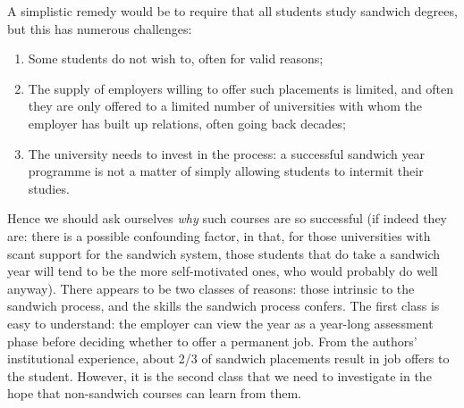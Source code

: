 \documentclass[conference]{IEEEtran}
\begin{document}
A simplistic remedy would be to require that all students study
sandwich degrees, but this has numerous challenges:

\begin{enumerate}
\item Some students do not wish to, often for valid reasons;
\item The supply of employers willing to offer such placements is
limited, and often they are only offered to a limited number of
universities with whom the employer has built up relations, often
going back decades;
\item The university needs to invest in the process: a successful
sandwich year programme is not a matter of simply allowing students to
intermit their studies.
\end{enumerate}

Hence we should ask ourselves \emph{why} such courses are so
successful (if indeed they are: there is a possible confounding
factor, in that, for those universities with scant support for the
sandwich system, those students that do take a sandwich year will tend
to be the more self-motivated ones, who would probably do well
anyway). There appears to be two classes of reasons: those intrinsic
to the sandwich process, and the skills the sandwich process
confers. The first class is easy to understand: the employer can view
the year as a year-long assessment phase before deciding whether to
offer a permanent job. From the authors' institutional experience,
about 2/3 of sandwich placements result in job offers to the
student. However, it is the second class that we need to investigate
in the hope that non-sandwich courses can learn from them.


\end{document}

